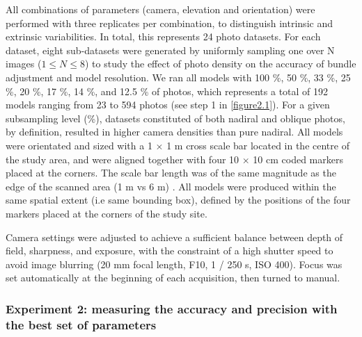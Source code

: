 All combinations of parameters (camera, elevation and orientation) were performed with three replicates per combination, to distinguish intrinsic and extrinsic variabilities. In total, this represents 24 photo datasets. For each dataset, eight sub-datasets were generated by uniformly sampling one over N images ($1 \leq N \leq 8$) to study the effect of photo density on the accuracy of bundle adjustment and model resolution. We ran all models with 100 \%, 50 \%, 33 \%, 25 \%, 20 \%, 17 \%, 14 \%, and 12.5 \% of photos, which represents a total of 192 models ranging from 23 to 594 photos (see step 1 in \autoref{figure2.1}). For a given subsampling level (\%), datasets constituted of both nadiral and oblique photos, by definition, resulted in higher camera densities than pure nadiral. All models were orientated and sized with a 1 $\times$ 1 m cross scale bar located in the centre of the study area, and were aligned together with four 10 $\times$ 10 cm coded markers placed at the corners. The scale bar length was of the same magnitude as the edge of the scanned area (1 m vs 6 m) \citep{vdi/vde_optical_2002}. All models were produced within the same spatial extent (i.e same bounding box), defined by the positions of the four markers placed at the corners of the study site.

Camera settings were adjusted to achieve a sufficient balance between depth of field, sharpness, and exposure, with the constraint of a high shutter speed to avoid image blurring (20 mm focal length, F10, 1 / 250 s, ISO 400). Focus was set automatically at the beginning of each acquisition, then turned to manual.

\subsubsection{Experiment 2: measuring the accuracy and precision with the best set of parameters}\label{chapitre2_2.1.2}

